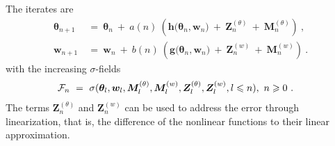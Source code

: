 \documentclass{article}
\newcommand\Bg{\bm{g}}
\newcommand\Bh{\bm{h}}
\newcommand\Bw{\bm{w}}
\newcommand\BM{\bm{M}}
\newcommand\BZ{\bm{Z}}
\newcommand\Bth{\bm{\theta}}
\renewcommand{\leq}{\leqslant}
\renewcommand{\geq}{\geqslant}
\begin{document}
The iterates are
\begin{align}
\label{eq:iter1Mokkadem}
\Bth_{n+1} \ &= \ \Bth_n \ + \ a(n) \ \left(\Bh\big(\Bth_n, \Bw_n\big) \ + \
               \BZ^{(\theta)}_n \ + \ \BM^{(\theta)}_{n}\right) \ ,\\
\label{eq:iter2Mokkadem}
\Bw_{n+1} \ &= \ \Bw_n  \ + \ b(n)\ \left(\Bg\big(\Bth_n, \Bw_n\big) \ + \
              \BZ^{(w)}_n \ + \ \BM^{(w)}_{n}\right) \ .
\end{align}
with the increasing $\sigma$-fields
\begin{align}
\cF_n \ &= \ \sigma(\Bth_l, \Bw_l, \BM^{(\theta)}_{l}, \BM^{(w)}_{l},
          \BZ^{(\theta)}_{l}, \BZ^{(w)}_{l}, l \leq n), \ n \geq 0 \ .
\end{align}
The terms $\BZ^{(\theta)}_n$ and $\BZ^{(w)}_n$ can be used to address
the error through linearization, that is, the difference of the
nonlinear functions to their linear approximation.
\end{document}
